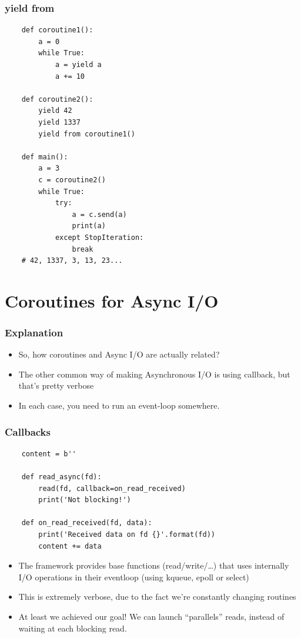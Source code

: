 \documentclass[ignorenonframetext,]{beamer}
\begin{document}
\begin{frame}[fragile]\frametitle{yield from}

\tiny{
\begin{verbatim}
    def coroutine1():
        a = 0
        while True:
            a = yield a
            a += 10

    def coroutine2():
        yield 42
        yield 1337
        yield from coroutine1()

    def main():
        a = 3
        c = coroutine2()
        while True:
            try:
                a = c.send(a)
                print(a)
            except StopIteration:
                break
    # 42, 1337, 3, 13, 23...
\end{verbatim}
}

\end{frame}

\section{Coroutines for Async I/O}

\begin{frame}[fragile]\frametitle{Explanation}

\begin{itemize}[<+->]
\itemsep1pt\parskip0pt
\item
  So, how coroutines and Async I/O are actually related?
\item
  The other common way of making Asynchronous I/O is using callback, but
  that's pretty verbose
\item
  In each case, you need to run an event-loop somewhere.
\end{itemize}

\end{frame}

\begin{frame}[fragile]\frametitle{Callbacks}

\tiny{
\begin{verbatim}
    content = b''

    def read_async(fd):
        read(fd, callback=on_read_received)
        print('Not blocking!')

    def on_read_received(fd, data):
        print('Received data on fd {}'.format(fd))
        content += data

\end{verbatim}
}

\normalsize{
\begin{itemize}[<+->]
\itemsep1pt\parskip0pt
\item
  The framework provides base functions (read/write/\ldots{}) that uses
  internally I/O operations in their eventloop (using kqueue,
  epoll or select)
\item
  This is extremely verbose, due to the fact we're constantly changing
  routines
\item
  At least we achieved our goal! We can launch ``parallels'' reads,
  instead of waiting at each blocking read.
\end{itemize}
}

\end{frame}
\end{document}
